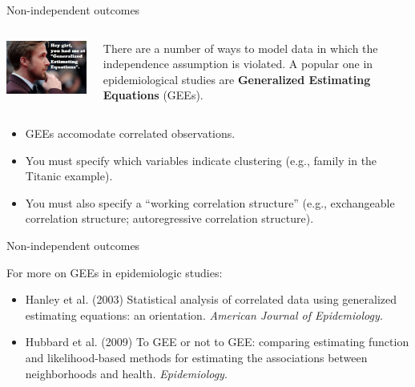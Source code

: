 \documentclass[ignorenonframetext,]{beamer}
\providecommand{\tightlist}{%
  \setlength{\itemsep}{0pt}\setlength{\parskip}{0pt}}
\begin{document}
\begin{frame}{Non-independent outcomes}

\begin{columns}
\begin{column}{0.5\textwidth}
\includegraphics{images/GEE.jpg}
\end{column}

\begin{column}{0.5\textwidth}
There are a number of ways to model data in which the independence assumption is violated. A popular one in epidemiological studies are \textbf{Generalized Estimating Equations} (GEEs).
\end{column}
\end{columns}

\begin{itemize}
\tightlist
\item
  GEEs accomodate correlated observations.
\item
  You must specify which variables indicate clustering (e.g., family in
  the Titanic example).
\item
  You must also specify a ``working correlation structure'' (e.g.,
  exchangeable correlation structure; autoregressive correlation
  structure).
\end{itemize}

\end{frame}

\begin{frame}{Non-independent outcomes}

For more on GEEs in epidemiologic studies:

\begin{itemize}
\tightlist
\item
  Hanley et al. (2003) Statistical analysis of correlated data using
  generalized estimating equations: an orientation.
  \textit{American Journal of Epidemiology.}
\item
  Hubbard et al. (2009) To GEE or not to GEE: comparing estimating
  function and likelihood-based methods for estimating the associations
  between neighborhoods and health. \textit{Epidemiology}.
\end{itemize}

\end{frame}
\end{document}
